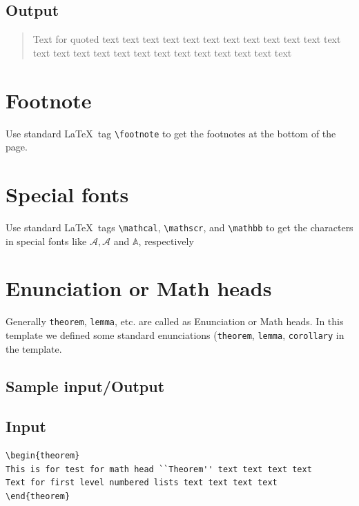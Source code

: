 \documentclass[]{Liebert_Author}
\begin{document}
\subsection*{Output}

\begin{quote}
Text for quoted text text text text text text text text text text text
text text text text text text text text text text text text text text 
\end{quote}

\section{Footnote}

Use standard \LaTeX\ tag \verb!\footnote! to get the footnotes at the
bottom of the page.

\section{Special fonts}

Use standard \LaTeX\ tags \verb!\mathcal!, \verb!\mathscr!, and
\verb!\mathbb! to get the characters in special fonts like
$\mathcal{A}, \mathscr{A}$ and $\mathbb{A}$, respectively

\section{Enunciation or Math heads}

Generally \verb!theorem!, \verb!lemma!, etc. are called as
Enunciation or Math heads. In this template we defined some standard
enunciations (\verb!theorem!, \verb!lemma!, \verb!corollary! in the
template. 

\subsection*{Sample input/Output}

\subsection{Input}

\begin{verbatim}
\begin{theorem}
This is for test for math head ``Theorem'' text text text text
Text for first level numbered lists text text text text 
\end{theorem}
\end{verbatim}
\end{document}
